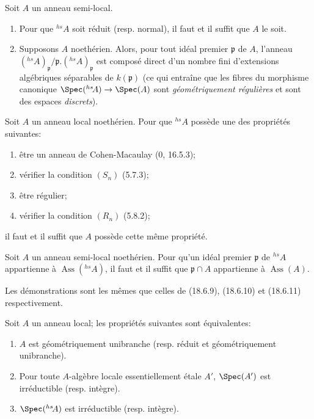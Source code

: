 \begin{proposition}[18.8.12]
\label{IV.18.8.12}
Soit $A$ un anneau semi-local.
\begin{enumerate}
  \item[(i)] Pour que ${}^{hs}\!A$ soit réduit (resp. normal), il faut et il suffit que $A$ le soit.
  \item[(ii)] Supposons $A$ noethérien. Alors, pour tout idéal premier $\mathfrak p$ de $A$, l'anneau $({}^{hs}\!A)_{\mathfrak p}/\mathfrak p.({}^{hs}\!A)_{\mathfrak p}$ est composé direct d'un nombre fini d'extensions algébriques séparables de $k(\mathfrak p)$ (ce qui entraîne que les fibres du morphisme canonique $\Spec({}^{hs}\!A)\to\Spec(A)$ sont \emph{géométriquement régulières} et sont des espaces \emph{discrets}).
\end{enumerate}
\end{proposition}

\begin{corollary}[18.8.13]
\label{IV.18.8.13}
Soit $A$ un anneau local noethérien. Pour que ${}^{hs}\!A$ possède une des propriétés suivantes:
\begin{enumerate}
  \item[$a)$] être un anneau de Cohen-Macaulay (0, 16.5.3);
  \item[$b)$] vérifier la condition $(S_n)$ (5.7.3);
  \item[$c)$] être régulier;
  \item[$d)$] vérifier la condition $(R_n)$ (5.8.2);
\end{enumerate}
il faut et il suffit que $A$ possède cette même propriété.
\end{corollary}

\begin{corollary}[18.8.14]
\label{IV.18.8.14}
Soit $A$ un anneau semi-local noethérien. Pour qu'un idéal premier $\mathfrak p$ de ${}^{hs}\!A$ appartienne à $\operatorname{Ass}({}^{hs}\!A)$, il faut et il suffit que $\mathfrak p\cap A$ appartienne à $\operatorname{Ass}(A)$.
\end{corollary}

Les démonstrations sont les mêmes que celles de (18.6.9), (18.6.10) et (18.6.11) respectivement.

\begin{proposition}[18.8.15]
\label{IV.18.8.15}
Soit $A$ un anneau local; les propriétés suivantes sont équivalentes:
\begin{enumerate}
  \item[$a)$] $A$ est géométriquement unibranche (resp. réduit et géométriquement unibranche).
  \item[$b)$] Pour toute $A$-algèbre locale essentiellement étale $A'$, $\Spec(A')$ est irréductible (resp. intègre).
  \item[$c)$] $\Spec({}^{hs}\!A)$ est irréductible (resp. intègre).
\end{enumerate}
\end{proposition}

